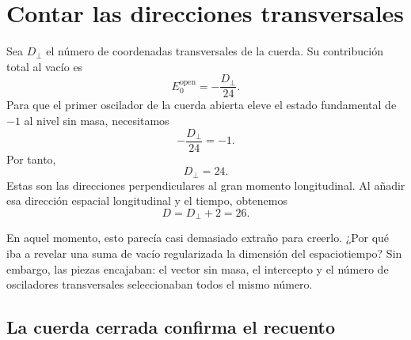 \section{Contar las direcciones transversales}

Sea \(D_\perp\) el número de coordenadas transversales de la cuerda. Su contribución total al vacío es \begin{equation}
  E_0^{\mathrm{open}}
  =-\frac{D_\perp}{24}.
  \label{eq:l05-open-vacuum}
\end{equation} Para que el primer oscilador de la cuerda abierta eleve el estado fundamental de \(-1\) al nivel sin masa, necesitamos \begin{equation}
  -\frac{D_\perp}{24}=-1.
\end{equation} Por tanto, \begin{equation}
  D_\perp=24.
\end{equation} Estas son las direcciones perpendiculares al gran momento longitudinal. Al añadir esa dirección espacial longitudinal y el tiempo, obtenemos \begin{equation}
  D=D_\perp+2=26.
  \label{eq:l05-critical-dimension}
\end{equation}

\begin{classroomqa}\end{classroomqa}

En aquel momento, esto parecía casi demasiado extraño para creerlo. ¿Por qué iba a revelar una suma de vacío regularizada la dimensión del espaciotiempo? Sin embargo, las piezas encajaban: el vector sin masa, el intercepto y el número de osciladores transversales seleccionaban todos el mismo número.

\subsection{La cuerda cerrada confirma el recuento}

